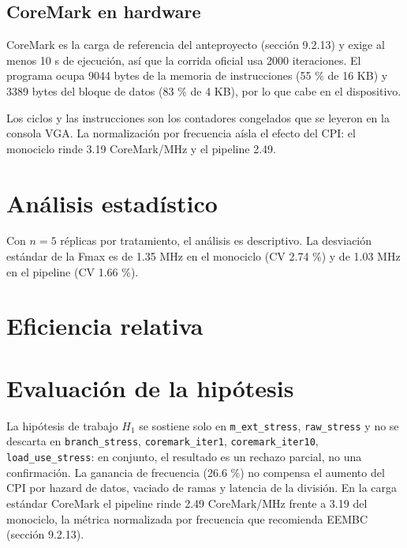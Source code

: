 



\subsection{CoreMark en hardware}

CoreMark es la carga de referencia del anteproyecto (sección 9.2.13) y exige al menos 10 s de ejecución, así que la corrida oficial usa 2000 iteraciones. El programa ocupa 9044 bytes de la memoria de instrucciones (55 \% de 16 KB) y 3389 bytes del bloque de datos (83 \% de 4 KB), por lo que cabe en el dispositivo.



Los ciclos y las instrucciones son los contadores congelados que se leyeron en la consola VGA. La normalización por frecuencia aísla el efecto del CPI: el monociclo rinde 3.19 CoreMark/MHz y el pipeline 2.49.

\section{Análisis estadístico}

Con $n = 5$ réplicas por tratamiento, el análisis es descriptivo. La desviación estándar de la Fmax es de 1.35 MHz en el monociclo (CV 2.74 \%) y de 1.03 MHz en el pipeline (CV 1.66 \%).



\section{Eficiencia relativa}





\section{Evaluación de la hipótesis}



La hipótesis de trabajo $H_1$ se sostiene solo en \texttt{m\_ext\_stress}, \texttt{raw\_stress} y no se descarta en \texttt{branch\_stress}, \texttt{coremark\_iter1}, \texttt{coremark\_iter10}, \texttt{load\_use\_stress}: en conjunto, el resultado es un rechazo parcial, no una confirmación. La ganancia de frecuencia (26.6 \%) no compensa el aumento del CPI por hazard de datos, vaciado de ramas y latencia de la división. En la carga estándar CoreMark el pipeline rinde 2.49 CoreMark/MHz frente a 3.19 del monociclo, la métrica normalizada por frecuencia que recomienda EEMBC (sección 9.2.13).

